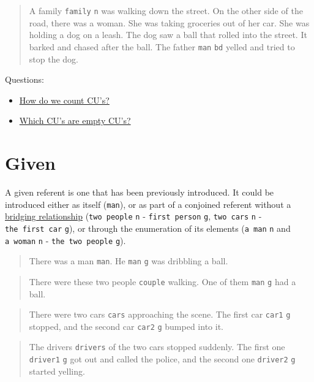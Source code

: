 \documentclass[
]{book}
\providecommand{\tightlist}{%
  \setlength{\itemsep}{0pt}\setlength{\parskip}{0pt}}
\begin{document}
\begin{quote}
A family \texttt{family} \texttt{n} was walking down the street.
On the other side of the road, there was a woman.
She was taking groceries out of her car.
She was holding a dog on a leash.
The dog saw a ball that rolled into the street.
It barked and chased after the ball.
The father \texttt{man} \texttt{bd} yelled and tried to stop the dog.
\end{quote}

Questions:

\begin{itemize}
\tightlist
\item
  \protect\hyperlink{counting-cus}{How do we count CU's?}
\item
  \protect\hyperlink{empty-cus}{Which CU's are empty CU's?}
\end{itemize}

\hypertarget{given}{%
\section{Given}\label{given}}

A given referent is one that has been previously introduced.
It could be introduced either as itself (\texttt{man}),
or as part of a conjoined referent without a \protect\hyperlink{bridging-relationships}{bridging relationship}
(\texttt{two\ people} \texttt{n} - \texttt{first\ person} \texttt{g}, \texttt{two\ cars} \texttt{n} - \texttt{the\ first\ car} \texttt{g}),
or through the enumeration of its elements (\texttt{a\ man} \texttt{n} and \texttt{a\ woman} \texttt{n} - \texttt{the\ two\ people} \texttt{g}).

\begin{quote}
There was a man \texttt{man}.
He \texttt{man} \texttt{g} was dribbling a ball.
\end{quote}

\begin{quote}
There were these two people \texttt{couple} walking.
One of them \texttt{man} \texttt{g} had a ball.
\end{quote}

\begin{quote}
There were two cars \texttt{cars} approaching the scene.
The first car \texttt{car1} \texttt{g} stopped, and the second car \texttt{car2} \texttt{g} bumped into it.
\end{quote}

\begin{quote}
The drivers \texttt{drivers} of the two cars stopped suddenly.
The first one \texttt{driver1} \texttt{g} got out and called the police,
and the second one \texttt{driver2} \texttt{g} started yelling.
\end{quote}
\end{document}
